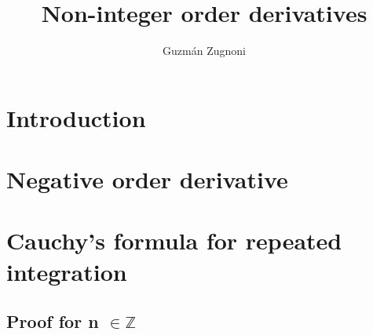 \documentclass{article}
\author{Guzmán Zugnoni}
\title{Non-integer order derivatives}
\renewcommand{\maketitle}{
\begin{center}
	\Huge\textbf \thetitle
\end{center}
}
\begin{document}
\maketitle

\newpage

\tableofcontents

\newpage

\section{Introduction}

\section{Negative order derivative}

\section{Cauchy's formula for repeated integration}
\subsection{Proof for n $\in \mathbb{Z}$}
\end{document}
